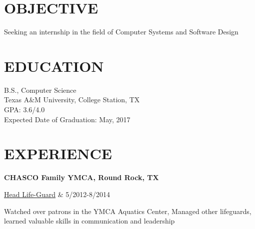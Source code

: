\documentclass[margin,11pt]{res} %
\begin{document}

\address{{\bf Contact Information}\\ Phone: (406)-531-6150\\Email: jaideng123@yahoo.com \\}
\address{ {\bf Permanent Address} \\ 1104 April Meadows Loop \\ Georgetown, TX 78626 \\
       }

\begin{resume}
 
\section{OBJECTIVE}  
     Seeking an internship in the field of Computer Systems and Software Design
 
\section{EDUCATION}       B.S., Computer Science  \\
                Texas A\&M University, College Station, TX \\ 
                GPA: 3.6/4.0 \\
                Expected Date of Graduation: May, 2017
 
 
\section{EXPERIENCE}   
                {\bf CHASCO Family YMCA, Round Rock, TX} \\ 
                \begin{ncolumn}{2} %
                \underline{Head Life-Guard} &   5/2012-8/2014 
                \end{ncolumn}

              Watched over patrons in the YMCA Aquatics Center, Managed other lifeguards, learned valuable skills in communication and leadership
 
 

\end{resume}
\end{document}
